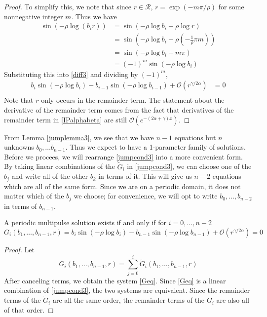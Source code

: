 \documentclass[thesis.tex]{subfiles}
\begin{document}
\begin{lemma}
\begin{proof}
To simplify this, we note that since $r \in \mathcal{R}$, $r = \exp(-m \pi / \rho)$ for some nonnegative integer $m$. Thus we have
\begin{align*}
\sin \left( -\rho \log (b_i r) \right)
&= \sin \left( -\rho \log b_i - \rho \log r  \right) \\
&= \sin \left( -\rho \log b_i - \rho \left( -\frac{1}{\rho}\pi m \right) \right) \\
&= \sin \left( -\rho \log b_i + m \pi \right) \\
&= (-1)^m \sin \left( -\rho \log b_i \right) 
\end{align*}
Substituting this into \eqref{diff3} and dividing by $(-1)^m$, 
\begin{align*}
b_i \sin \left( -\rho \log b_i \right) - b_{i-1} \sin \left( -\rho \log b_{i-1} \right) + \mathcal{O}(r^{\gamma / 2 \alpha}) &= 0 \\
\end{align*}
Note that $r$ only occurs in the remainder term. The statement about the derivative of the remainder term comes from the fact that derivatives of the remainder term in \eqref{IPalphabeta} are still $\mathcal{O}(e^{-(2 \alpha + \gamma) x})$.
\end{proof}
\end{lemma}

From Lemma \ref{jumplemma3}, we see that we have $n-1$ equations but $n$ unknowns $b_0, \dots b_{n-1}$. Thus we expect to have a 1-parameter family of solutions. Before we procees, we will rearrange \eqref{jumpcond3} into a more convenient form. By taking linear combinations of the $\tilde{G}_i$ in \eqref{jumpcond3}, we can choose one of the $b_j$ and write all of the other $b_k$ in terms of it. This will give us $n-2$ equations which are all of the same form. Since we are on a periodic domain, it does not matter which of the $b_j$ we choose; for convenience, we will opt to write $b_0, \dots, b_{n-2}$ in terms of $b_{n-1}$.


\begin{lemma}\label{diagonalG}
A periodic multipulse solution exists if and only if for $i = 0, \dots, n-2$
\begin{equation}\label{Geq}
G_i(b_1, \dots, b_{n-1}, r) = b_i \sin \left( -\rho \log b_i \right) - b_{n-1} \sin \left( -\rho \log b_{n-1} \right) + \mathcal{O}(r^{\gamma / 2 \alpha}) = 0
\end{equation}

\begin{proof}
Let \begin{equation}\label{Gidef}
G_i(b_1, \dots, b_{n-1}, r) = \sum_{j = 0}^i \tilde{G}_i(b_1, \dots, b_{n-1}, r)
\end{equation}
After canceling terms, we obtain the system \eqref{Geq}. Since \eqref{Geq} is a linear combination of \eqref{jumpcond3}, the two systems are equivalent. Since the remainder terms of the $\tilde{G}_i$ are all the same order, the remainder terms of the $G_i$ are also all of that order.
\end{proof}
\end{lemma}
\end{document}
